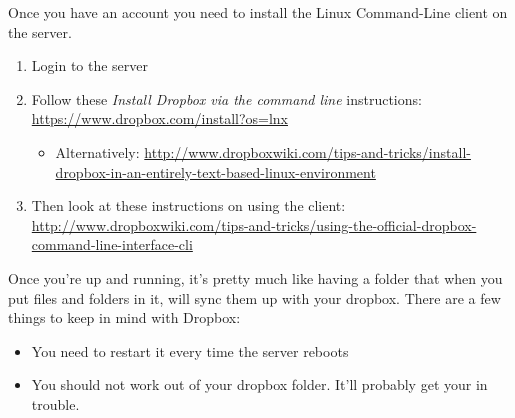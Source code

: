 \documentclass[]{tufte-handout}
\begin{document}
Once you have an account you need to install the Linux Command-Line client on the server.  
\begin{enumerate}
\item Login to the server
\item Follow these \textit{Install Dropbox via the command line} instructions: \url{https://www.dropbox.com/install?os=lnx}
\begin{itemize}
\item Alternatively: \url{http://www.dropboxwiki.com/tips-and-tricks/install-dropbox-in-an-entirely-text-based-linux-environment}
\end{itemize}
\item Then look at these instructions on using the client: \url{http://www.dropboxwiki.com/tips-and-tricks/using-the-official-dropbox-command-line-interface-cli}
\end{enumerate}

Once you're up and running, it's pretty much like having a folder that when you put files and folders in it, will sync them up with your dropbox.  There are a few things to keep in mind with Dropbox:
\begin{itemize}
\item You need to restart it every time the server reboots
\item You should not work out of your dropbox folder. It'll probably get your in trouble.
\end{itemize}
\end{document}
